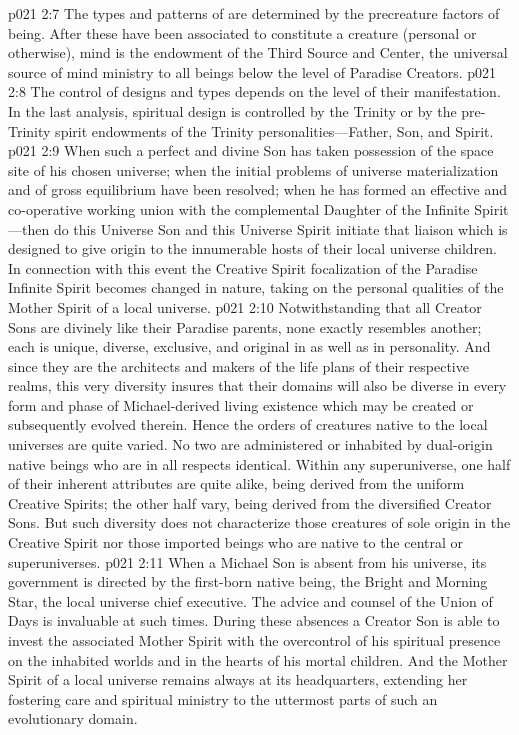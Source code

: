 \pc \vs p021 2:7 The types and patterns of  are determined by the precreature factors of being. After these have been associated to constitute a creature (personal or otherwise), mind is the endowment of the Third Source and Center, the universal source of mind ministry to all beings below the level of Paradise Creators.
\pc \vs p021 2:8 The control of  designs and types depends on the level of their manifestation. In the last analysis, spiritual design is controlled by the Trinity or by the pre\hyp{}Trinity spirit endowments of the Trinity personalities---Father, Son, and Spirit.
\pc \vs p021 2:9 When such a perfect and divine Son has taken possession of the space site of his chosen universe; when the initial problems of universe materialization and of gross equilibrium have been resolved; when he has formed an effective and co\hyp{}operative working union with the complemental Daughter of the Infinite Spirit---then do this Universe Son and this Universe Spirit initiate that liaison which is designed to give origin to the innumerable hosts of their local universe children. In connection with this event the Creative Spirit focalization of the Paradise Infinite Spirit becomes changed in nature, taking on the personal qualities of the Mother Spirit of a local universe.
\vs p021 2:10 Notwithstanding that all Creator Sons are divinely like their Paradise parents, none exactly resembles another; each is unique, diverse, exclusive, and original in  as well as in personality. And since they are the architects and makers of the life plans of their respective realms, this very diversity insures that their domains will also be diverse in every form and phase of Michael\hyp{}derived living existence which may be created or subsequently evolved therein. Hence the orders of creatures native to the local universes are quite varied. No two are administered or inhabited by dual\hyp{}origin native beings who are in all respects identical. Within any superuniverse, one half of their inherent attributes are quite alike, being derived from the uniform Creative Spirits; the other half vary, being derived from the diversified Creator Sons. But such diversity does not characterize those creatures of sole origin in the Creative Spirit nor those imported beings who are native to the central or superuniverses.\plusone
\pc \vs p021 2:11 When a Michael Son is absent from his universe, its government is directed by the first\hyp{}born native being, the Bright and Morning Star, the local universe chief executive. The advice and counsel of the Union of Days is invaluable at such times. During these absences a Creator Son is able to invest the associated Mother Spirit with the overcontrol of his spiritual presence on the inhabited worlds and in the hearts of his mortal children. And the Mother Spirit of a local universe remains always at its headquarters, extending her fostering care and spiritual ministry to the uttermost parts of such an evolutionary domain.
